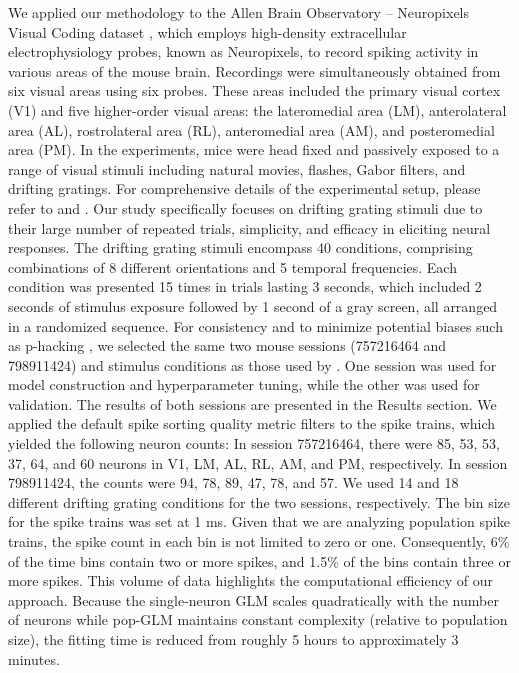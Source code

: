 \documentclass[12pt]{article}
\begin{document}
We applied our methodology to the Allen Brain Observatory – Neuropixels Visual Coding dataset \cite{allendata}, which employs high-density extracellular electrophysiology probes, known as Neuropixels, to record spiking activity in various areas of the mouse brain. Recordings were simultaneously obtained from six visual areas using six probes. These areas included the primary visual cortex (V1) and five higher-order visual areas: the lateromedial area (LM), anterolateral area (AL), rostrolateral area (RL), anteromedial area (AM), and posteromedial area (PM). In the experiments, mice were head fixed and passively exposed to a range of visual stimuli including natural movies, flashes, Gabor filters, and drifting gratings. For comprehensive details of the experimental setup, please refer to \cite{siegle2021survey} and \cite{allendata}. Our study specifically focuses on drifting grating stimuli due to their large number of repeated trials, simplicity, and efficacy in eliciting neural responses. The drifting grating stimuli encompass 40 conditions, comprising combinations of 8 different orientations and 5 temporal frequencies. Each condition was presented 15 times in trials lasting 3 seconds, which included 2 seconds of stimulus exposure followed by 1 second of a gray screen, all arranged in a randomized sequence. For consistency and to minimize potential biases such as p-hacking \cite{stefan2023big, greenland2016statistical}, we selected the same two mouse sessions (757216464 and 798911424) and stimulus conditions as those used by \citet{chen2022population}. One session was used for model construction and hyperparameter tuning, while the other was used for validation. The results of both sessions are presented in the Results section. We applied the default spike sorting quality metric filters to the spike trains, which yielded the following neuron counts: In session 757216464, there were 85, 53, 53, 37, 64, and 60 neurons in V1, LM, AL, RL, AM, and PM, respectively. In session 798911424, the counts were 94, 78, 89, 47, 78, and 57. We used 14 and 18 different drifting grating conditions for the two sessions, respectively. The bin size for the spike trains was set at 1 ms. Given that we are analyzing population spike trains, the spike count in each bin is not limited to zero or one. Consequently, 6\% of the time bins contain two or more spikes, and 1.5\% of the bins contain three or more spikes. This volume of data highlights the computational efficiency of our approach. Because the single-neuron GLM scales quadratically with the number of neurons while pop-GLM maintains constant complexity (relative to population size), the fitting time is reduced from roughly 5 hours to approximately 3 minutes.
\end{document}
